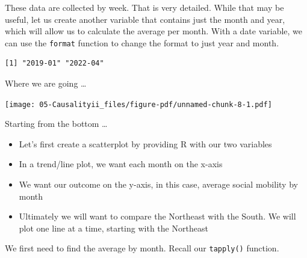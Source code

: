 \documentclass[
  letterpaper,
  DIV=11,
  numbers=noendperiod]{scrreprt}
\newenvironment{Shaded}{\begin{snugshade}}{\end{snugshade}}
\newcommand{\AttributeTok}[1]{\textcolor[rgb]{0.40,0.45,0.13}{#1}}
\newcommand{\FunctionTok}[1]{\textcolor[rgb]{0.28,0.35,0.67}{#1}}
\newcommand{\NormalTok}[1]{\textcolor[rgb]{0.00,0.23,0.31}{#1}}
\newcommand{\OtherTok}[1]{\textcolor[rgb]{0.00,0.23,0.31}{#1}}
\newcommand{\SpecialCharTok}[1]{\textcolor[rgb]{0.37,0.37,0.37}{#1}}
\newcommand{\StringTok}[1]{\textcolor[rgb]{0.13,0.47,0.30}{#1}}
\providecommand{\tightlist}{%
  \setlength{\itemsep}{0pt}\setlength{\parskip}{0pt}}\usepackage{longtable,booktabs,array}
\begin{document}
These data are collected by week. That is very detailed. While that may
be useful, let us create another variable that contains just the month
and year, which will allow us to calculate the average per month. With a
date variable, we can use the \texttt{format} function to change the
format to just year and month.

\begin{Shaded}
\end{Shaded}

\begin{verbatim}
[1] "2019-01" "2022-04"
\end{verbatim}

Where we are going \ldots{}

\texttt{[image: 05-Causalityii\_files/figure-pdf/unnamed-chunk-8-1.pdf]}

Starting from the bottom \ldots{}

\begin{itemize}
\tightlist
\item
  Let's first create a scatterplot by providing R with our two variables
\item
  In a trend/line plot, we want each month on the x-axis
\item
  We want our outcome on the y-axis, in this case, average social
  mobility by month
\item
  Ultimately we will want to compare the Northeast with the South. We
  will plot one line at a time, starting with the Northeast
\end{itemize}

We first need to find the average by month. Recall our \texttt{tapply()}
function.

\begin{Shaded}
\end{Shaded}
\end{document}
